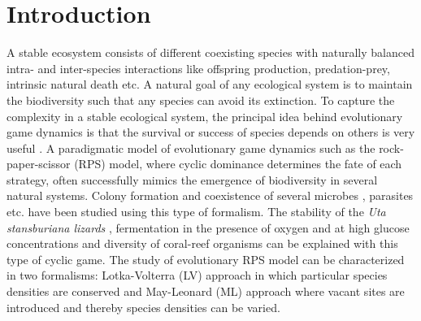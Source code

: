 \documentclass[aps, pre, twocolumn, amsmath, superscriptaddress,showkeys,showpacs]{revtex4-1}
\begin{document}
	\maketitle
	
	\section{Introduction} 
	\label{intro}
	\noindent
	{A stable ecosystem consists of different coexisting species with naturally balanced intra- and inter-species interactions like offspring production, predation-prey, intrinsic natural death etc. A natural goal of any ecological system is to maintain the biodiversity such that any species can avoid its extinction.} To capture { the complexity in a stable ecological system, the principal idea behind evolutionary game dynamics is that the survival or success of species depends on others is very useful \cite{szabo2007evolutionary,perc2017statistical,szolnoki2014cyclic,pennisi2005determines, mobilia2016influence,traulsen2006stochastic}.}
	 A paradigmatic {model of} evolutionary game dynamics such as the rock-paper-scissor (RPS) model, where  cyclic dominance \cite{arunachalam2020rock, kerr2002local, park2019fitness, reichenbach2007mobility, hashimoto2018clustering}  determines the fate of each strategy, {often successfully mimics the emergence} of biodiversity in several natural systems. Colony formation and coexistence of several microbes \cite{ke2020effects, momeni2017lotka, kerr2002local,nahum2011evolution}, parasites \cite{cameron2009parasite, segura2013competition} etc. have been studied using this type of formalism. The stability of the {\it Uta stansburiana lizards} \cite{sinervo1996rock}, fermentation in the presence of oxygen and at high glucose concentrations \cite{pfeiffer2014evolutionary}  and diversity of coral-reef organisms \cite{jackson1975alleopathy} can  be explained with this type of cyclic game. 
	 {The study of evolutionary RPS model can be characterized \cite{sinervo1996rock} in two formalisms: Lotka-Volterra (LV) approach \cite{bacaer2011lotka, lotka1920analytical, volterra1926fluctuations} in which particular species densities are conserved and May-Leonard (ML) approach \cite{chi1998asymmetric} where vacant sites are introduced and thereby species densities can be varied.}
\end{document}
